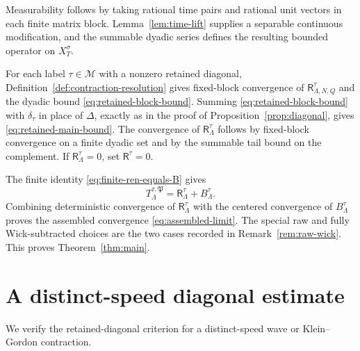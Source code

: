 \documentclass[11pt,reqno]{amsart}
\numberwithin{equation}{section}
\theoremstyle{plain}
\theoremstyle{definition}
\newcommand{\cM}{\mathcal M}
\newcommand{\Ret}{\mathsf R}
\begin{document}
Measurability follows by taking rational time pairs and rational unit
vectors in each finite matrix block.  Lemma~\ref{lem:time-lift} supplies a
separable continuous modification, and the summable dyadic series defines
the resulting bounded operator on \(X_T^\sigma\).

For each label \(\tau\in\cM\) with a nonzero retained diagonal, Definition~\ref{def:contraction-resolution} gives fixed-block convergence of \(\Ret^\tau_{\Lambda,N,Q}\) and the dyadic bound \eqref{eq:retained-block-bound}.  Summing \eqref{eq:retained-block-bound} with \(\delta_\tau\) in place of \(\Delta\), exactly as in the proof of Proposition~\ref{prop:diagonal}, gives \eqref{eq:retained-main-bound}.  The convergence of \(\Ret^\tau_\Lambda\) follows by fixed-block convergence on a finite dyadic set and by the summable tail bound on the complement.  If \(\Ret^\tau_\Lambda=0\), set \(\Ret^\tau=0\).

The finite identity \eqref{eq:finite-ren-equals-B} gives
\[
        T_{\Lambda}^{\tau,\mathfrak P}=\Ret^\tau_\Lambda+B^\tau_\Lambda .
\]
Combining deterministic convergence of \(\Ret^\tau_\Lambda\) with the centered convergence of \(B^\tau_\Lambda\) proves the assembled convergence \eqref{eq:assembled-limit}.  The special raw and fully Wick-subtracted choices are the two cases recorded in Remark~\ref{rem:raw-wick}.  This proves Theorem~\ref{thm:main}.


\section{A distinct-speed diagonal estimate}\label{sec:verification}

We verify the retained-diagonal criterion for a distinct-speed wave or
Klein--Gordon contraction.
\end{document}
